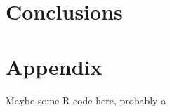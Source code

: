 \documentclass[11pt,a4paper,twoside]{book}\usepackage[]{graphicx}\usepackage[]{color}
\begin{document}




\chapter{Conclusions}


\appendix




\chapter{Appendix}

Maybe some R code here, probably a 




\cleardoublepage
{}
{}


 


\cleardoublepage
\end{document}
